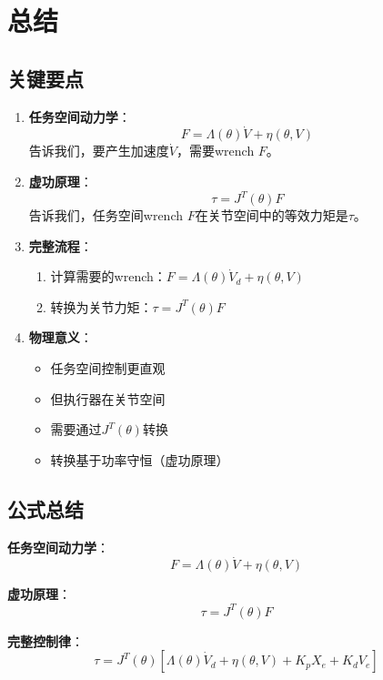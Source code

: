 \documentclass[12pt,a4paper]{article}
\begin{document}
\section{总结}

\subsection{关键要点}

\begin{enumerate}
\item \textbf{任务空间动力学}：
\begin{equation}
F = \Lambda(\theta)\dot{V} + \eta(\theta, V)
\end{equation}
告诉我们，要产生加速度$\dot{V}$，需要wrench $F$。

\item \textbf{虚功原理}：
\begin{equation}
\tau = J^T(\theta)F
\end{equation}
告诉我们，任务空间wrench $F$在关节空间中的等效力矩是$\tau$。

\item \textbf{完整流程}：
\begin{enumerate}
\item 计算需要的wrench：$F = \Lambda(\theta)\dot{V}_d + \eta(\theta, V)$
\item 转换为关节力矩：$\tau = J^T(\theta)F$
\end{enumerate}

\item \textbf{物理意义}：
\begin{itemize}
\item 任务空间控制更直观
\item 但执行器在关节空间
\item 需要通过$J^T(\theta)$转换
\item 转换基于功率守恒（虚功原理）
\end{itemize}
\end{enumerate}

\subsection{公式总结}

\textbf{任务空间动力学}：
\begin{equation}
F = \Lambda(\theta)\dot{V} + \eta(\theta, V) \tag{8.89}
\end{equation}

\textbf{虚功原理}：
\begin{equation}
\tau = J^T(\theta)F \tag{8.51}
\end{equation}

\textbf{完整控制律}：
\begin{equation}
\tau = J^T(\theta)\left[\Lambda(\theta)\dot{V}_d + \eta(\theta, V) + K_p X_e + K_d V_e\right] \tag{11.47}
\end{equation}
\end{document}
